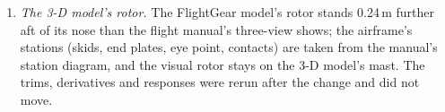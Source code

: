 \documentclass[10pt,a4paper,twocolumn]{article}
\begin{document}
\begin{enumerate}
loading the model, so its boost servos were built for JSBSim's default 1/120\,s and, run at 960\,Hz, answered eight times too fast (63\,\% in 3\,ms instead
of 25\,ms); FlightGear, which sets the step first, was not affected. With the step set first the roll frequency response's phase follows the identified one
within a few degrees from 6 to 15\,rad/s, and the doublets' errors are slightly smaller; the other results move little.
\item \emph{The 3-D model's rotor.} The FlightGear model's rotor stands 0.24\,m further aft of its nose than the flight manual's three-view shows; the
airframe's stations (skids, end plates, eye point, contacts) are taken from the manual's station diagram, and the visual rotor stays on the 3-D model's
mast. The trims, derivatives and responses were rerun after the change and did not move.
\end{enumerate}

\end{document}
